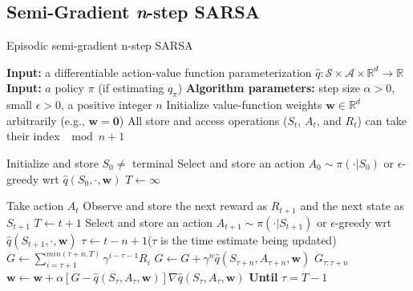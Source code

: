 \documentclass[journal]{IEEEtran}
\begin{document}
\subsection{Semi-Gradient \emph{n}-step SARSA}

\begin{algorithm}
    \caption{Episodic semi-gradient n-step SARSA~\cite{sutton2018}}
    \label{alg:semi-grad_sarsa}
    \begin{algorithmic}\small
      \State \textbf{Input:} a differentiable action-value function parameterization 
      \(\hat{q}:\mathcal{S} \times \mathcal{A} \times \mathbb{R}^d \rightarrow \mathbb{R}\)
      \State \textbf{Input:} \(a\) policy \(\pi\) (if estimating \(q_\pi\)) 
      \State \textbf{Algorithm parameters:} step size \(\alpha>0\), small \(\epsilon>0\), 
          a positive integer \(n\)
      \State Initialize value-function weights \(\mathbf{w} \in \mathbb{R}^d\) arbitrarily 
          (e.g., \(\mathbf{w} = \mathbf{0}\)) 
      \State All store and access operations (\(S_t\), \(A_t\), and \(R_t\)) 
          can take their index \(\mod n+1\)

        \State Initialize and store \(S_0\neq\) terminal
        \State Select and store an action \(A_0\sim\pi(\cdot|S_0)\) 
        \State \quad or \(\epsilon\)-greedy wrt \(\hat{q}(S_0,\cdot,\mathbf{w})\)
        \State \(T\leftarrow\infty\)

            \State Take action \(A_t\) 
            \State Observe and store the next reward as \(R_{t+1}\) 
            \State \quad and the next state as \(S_{t+1}\)
              \State \(T \leftarrow t+1\)
            \Else
              \State Select and store an action \(A_{t+1}\sim\pi(\cdot|S_{t+1})\) or 
              \State \quad \(\epsilon\)-greedy wrt \(\hat{q}(S_{t+1},\cdot,\mathbf{w})\)
            \EndIf
            \State \(\tau \leftarrow t-n+1\)\qquad (\(\tau\) is the time estimate being updated)
          \EndIf
            \State \(G \leftarrow \sum^{min(\tau+n,T)}_{i=\tau+1}\gamma^{i-\tau-1}R_i \)
              \State\(G\leftarrow G+\gamma^n \hat{q}(S_{\tau+n},A_{\tau+n},\mathbf{w})\)
              \Comment \(G_{\tau:\tau+n}\)
            \EndIf
            \State \(\mathbf{w}\leftarrow\mathbf{w}+\alpha[G-\hat{q}(S_\tau,A_\tau,\mathbf{w})] 
                \nabla\hat{q}(S_\tau,A_\tau,\mathbf{w})\)
          \EndIf
        \EndFor
        \State \textbf{Until} \(\tau = T-1\)
      \EndFor
    \end{algorithmic}
\end{algorithm}
\end{document}
